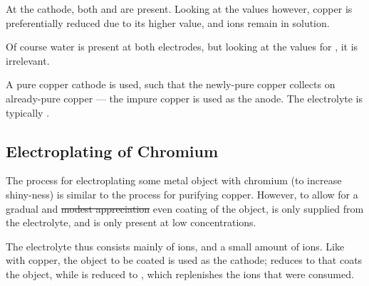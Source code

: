 			At the cathode, both  and  are present. Looking at the \Eo{} values however, copper is preferentially reduced
			due to its higher \Eo{} value, and  ions remain in solution.

			Of course water is present at both electrodes, but looking at the values for \Eo{}, it is irrelevant.

			A pure copper cathode is used, such that the newly-pure copper collects on already-pure copper --- the impure copper is used as
			the anode. The electrolyte is typically .



		\subsection{Electroplating of Chromium}

			The process for electroplating some metal object with chromium (to increase shiny-ness) is similar to the process for purifying
			copper. However, to allow for a gradual and \sout{modest appreciation} even coating of the object,  is only supplied
			from the electrolyte, and is only present at low concentrations.

			The electrolyte thus consists mainly of  ions, and a small amount of  ions. Like with copper, the object
			to be coated is used as the cathode;  reduces to  that coats the object, while  is reduced to
			, which replenishes the ions that were consumed.









